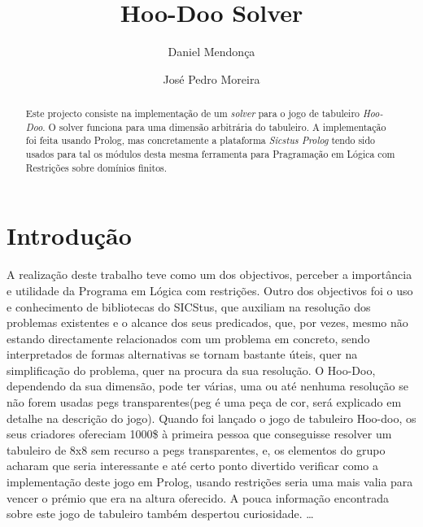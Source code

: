 \documentclass{llncs}
\begin{document}
\title{Hoo-Doo Solver}

\author{Daniel Mendonça \and Jos\'{e} Pedro Moreira}


\maketitle
%
\begin{abstract}
Este projecto consiste na implementação de um \textit{solver} para o jogo de tabuleiro \textit{Hoo-Doo}. O solver funciona para uma dimensão arbitrária do tabuleiro. A implementação foi feita usando Prolog, mas concretamente a plataforma \emph{Sicstus Prolog}  tendo sido usados para tal os módulos desta mesma ferramenta para Pragramação em Lógica com Restrições sobre domínios finitos.
\end{abstract}
%
\section{Introdu\c{c}\~{a}o}
%
A realização deste trabalho teve como um dos objectivos, perceber a importância e utilidade da Programa em Lógica com restrições. Outro dos objectivos foi o uso e conhecimento de bibliotecas do SICStus, que auxiliam na resolução dos problemas existentes e o alcance dos seus predicados, que, por vezes, mesmo não estando directamente relacionados com um problema em concreto, sendo interpretados de formas alternativas se tornam bastante úteis, quer na simplificação do problema, quer na procura da sua resolução.
O Hoo-Doo, dependendo da sua dimensão, pode ter várias, uma ou até nenhuma resolução se não forem usadas pegs transparentes(peg é uma peça de cor, será explicado em detalhe na descrição do jogo). Quando foi lançado o jogo de tabuleiro Hoo-doo, os seus criadores ofereciam 1000\$ à primeira pessoa que conseguisse resolver um tabuleiro de 8x8 sem recurso a pegs transparentes, e, os elementos do grupo acharam que seria interessante e até certo ponto divertido verificar como a implementação deste jogo em Prolog, usando restrições seria uma mais valia para vencer o prémio que era na altura oferecido. A pouca informação encontrada sobre este jogo de tabuleiro também despertou curiosidade.
 \dots

%
\end{document}
